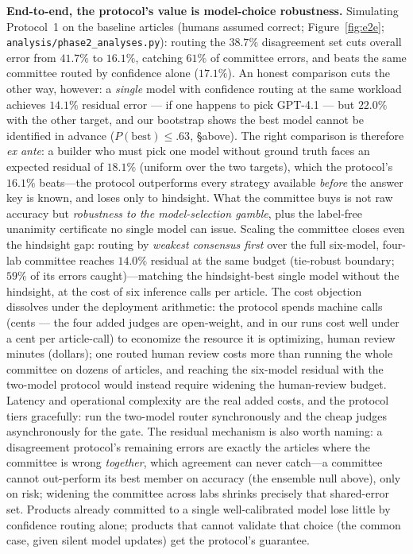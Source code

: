\documentclass{article}
\begin{document}
\textbf{End-to-end, the protocol's value is model-choice robustness.}
Simulating Protocol~1 on the baseline articles (humans assumed correct;
Figure~\ref{fig:e2e}; \texttt{analysis/phase2\_analyses.py}): routing the $38.7\%$
disagreement set cuts overall error from $41.7\%$ to $16.1\%$,
catching $61\%$ of committee errors, and beats the same committee
routed by confidence alone ($17.1\%$). An honest comparison cuts the
other way, however: a \emph{single} model with confidence routing at
the same workload achieves $14.1\%$ residual error --- if one happens
to pick GPT-4.1 --- but $22.0\%$ with the other target, and our
bootstrap shows the best model cannot be identified in advance
($P(\text{best}) \le .63$, \S above). The right comparison is
therefore \emph{ex ante}: a builder who must pick one model without
ground truth faces an expected residual of $18.1\%$ (uniform over the
two targets), which the protocol's $16.1\%$ beats---the protocol
outperforms every strategy available \emph{before} the answer key is
known, and loses only to hindsight. What the committee buys is not raw
accuracy but \emph{robustness to the model-selection gamble}, plus the
label-free unanimity certificate no single model can issue. Scaling the committee closes even the
hindsight gap: routing by \emph{weakest consensus first} over the full
six-model, four-lab committee reaches $14.0\%$ residual at the same
budget (tie-robust boundary; $59\%$ of its errors caught)---matching
the hindsight-best single model without the hindsight, at the cost of
six inference calls per article. The cost objection dissolves under
the deployment arithmetic: the protocol spends machine calls (cents ---
the four added judges are open-weight, and in our runs cost well under
a cent per article-call) to economize the resource it is optimizing,
human review minutes (dollars); one routed human review costs more than
running the whole committee on dozens of articles, and reaching the
six-model residual with the two-model protocol would instead require
widening the human-review budget. Latency and operational complexity
are the real added costs, and the protocol tiers gracefully: run the
two-model router synchronously and the cheap judges asynchronously for
the gate. The residual
mechanism is also worth naming: a disagreement protocol's remaining
errors are exactly the articles where the committee is wrong
\emph{together}, which agreement can never catch---a committee cannot
out-perform its best member on accuracy (the ensemble null above), only
on risk; widening the committee across labs shrinks precisely that
shared-error set. Products already committed to a single
well-calibrated model lose little by confidence routing alone; products
that cannot validate that choice (the common case, given silent model
updates) get the protocol's guarantee.
\end{document}
